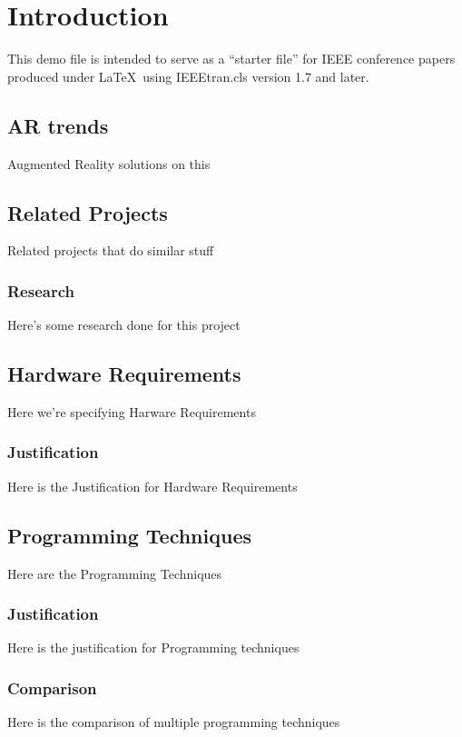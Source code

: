 \section{Introduction}
This demo file is intended to serve as a ``starter file''
for IEEE conference papers produced under \LaTeX\ using
IEEEtran.cls version 1.7 and later.


\subsection{AR trends}
Augmented Reality solutions on this

\subsection{Related Projects}
Related projects that do similar stuff

\subsubsection{Research}
Here's some research done for this project

\subsection{Hardware Requirements}
Here we're specifying Harware Requirements

\subsubsection{Justification}
Here is the Justification for Hardware Requirements

\subsection{Programming Techniques}
Here are the Programming Techniques

\subsubsection{Justification}
Here is the justification for Programming techniques

\subsubsection{Comparison}
Here is the comparison of multiple programming techniques
